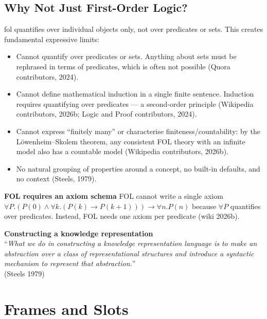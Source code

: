 \subsection*{Why Not Just First-Order Logic?}
\Gls{fol} quantifies over individual objects only, not over predicates or sets.
This creates fundamental expressive limits:
\begin{itemize}
    \item Cannot quantify over predicates or sets. Anything about sets must be
    rephrased in terms of predicates, which is often not possible
    (Quora contributors, 2024).

    \item Cannot define mathematical induction in a single finite sentence.
    Induction requires quantifying over predicates --- a second-order principle
    (Wikipedia contributors, 2026b; Logic and Proof contributors, 2024).

    \item Cannot express ``finitely many'' or characterise finiteness/countability:
    by the Löwenheim--Skolem theorem, any consistent FOL theory with an infinite
    model also has a countable model (Wikipedia contributors, 2026b).

    \item No natural grouping of properties around a concept, no built-in defaults,
    and no context (Steels, 1979).
\end{itemize}

\begin{lem}
    \textbf{FOL requires an axiom schema}
    FOL cannot write a single axiom
    $\forall P.(P (0) \land \forall k. (P (k) \rightarrow P (k+1))) \rightarrow \forall n. P (n)$
    because $\forall P$
    quantifies over predicates. Instead, FOL needs one axiom per predicate (wiki 2026b).
\end{lem}

\begin{theo}
    \textbf{Constructing a knowledge representation} \\
    ``\textit{What we do in constructing a knowledge representation language is to make an
    abstraction over a class of representational structures and introduce a syntactic
    mechanism to represent that abstraction.}'' \\
    (Steels 1979)
\end{theo}


\section{Frames and Slots} %


